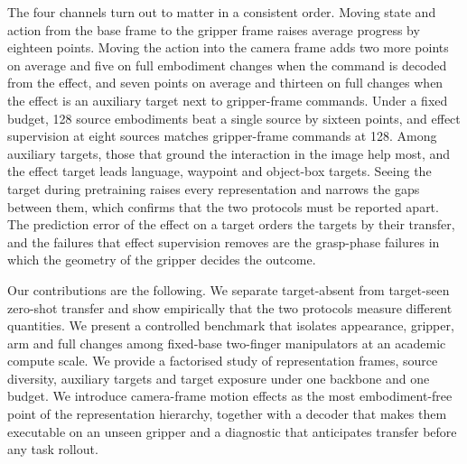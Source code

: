 The four channels turn out to matter in a consistent order. Moving state and action from the base frame to the gripper frame raises average progress by eighteen points. Moving the action into the camera frame adds two more points on average and five on full embodiment changes when the command is decoded from the effect, and seven points on average and thirteen on full changes when the effect is an auxiliary target next to gripper-frame commands. Under a fixed budget, 128 source embodiments beat a single source by sixteen points, and effect supervision at eight sources matches gripper-frame commands at 128. Among auxiliary targets, those that ground the interaction in the image help most, and the effect target leads language, waypoint and object-box targets. Seeing the target during pretraining raises every representation and narrows the gaps between them, which confirms that the two protocols must be reported apart. The prediction error of the effect on a target orders the targets by their transfer, and the failures that effect supervision removes are the grasp-phase failures in which the geometry of the gripper decides the outcome.

Our contributions are the following. We separate target-absent from target-seen zero-shot transfer and show empirically that the two protocols measure different quantities. We present a controlled benchmark that isolates appearance, gripper, arm and full changes among fixed-base two-finger manipulators at an academic compute scale. We provide a factorised study of representation frames, source diversity, auxiliary targets and target exposure under one backbone and one budget. We introduce camera-frame motion effects as the most embodiment-free point of the representation hierarchy, together with a decoder that makes them executable on an unseen gripper and a diagnostic that anticipates transfer before any task rollout.

